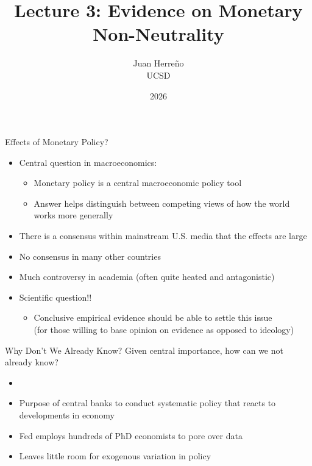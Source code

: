 \documentclass[11pt,aspectratio=169,xcolor={dvipsnames},hyperref={pdftex,pdfpagemode=UseNone,hidelinks,pdfdisplaydoctitle=true},usepdftitle=false]{beamer}
\title{Lecture 3: Evidence on Monetary Non-Neutrality}
\author{Juan Herre\~{n}o\\UCSD}
\date{2026}
\begin{document}
\maketitle



\begin{frame}{Effects of Monetary Policy?}
\begin{itemize}
\item Central question in macroeconomics:
\begin{itemize}
\item Monetary policy is a central macroeconomic policy tool
\item Answer helps distinguish between competing views of how the world works more generally \pause
\end{itemize}
\item There is a consensus within mainstream U.S. media that the effects are large
\item No consensus in many other countries
\item Much controversy in academia (often quite heated and antagonistic) \pause
\item Scientific question!! 
\begin{itemize}
\item Conclusive empirical evidence should be able to settle this issue \\ (for those willing to base opinion on evidence as opposed to ideology)
\end{itemize}
\end{itemize}
\end{frame}


\begin{frame}{Why Don't We Already Know?}
Given central importance, how can we not already know? \pause
\begin{itemize}
\item {\color{red}{Changes in monetary policy occur for a reason!!}}
\item Purpose of central banks to conduct systematic policy that reacts to developments in economy
\item Fed employs hundreds of PhD economists to pore over data
\item Leaves little room for exogenous variation in policy
\end{itemize}
\end{frame}
 
\end{document}
